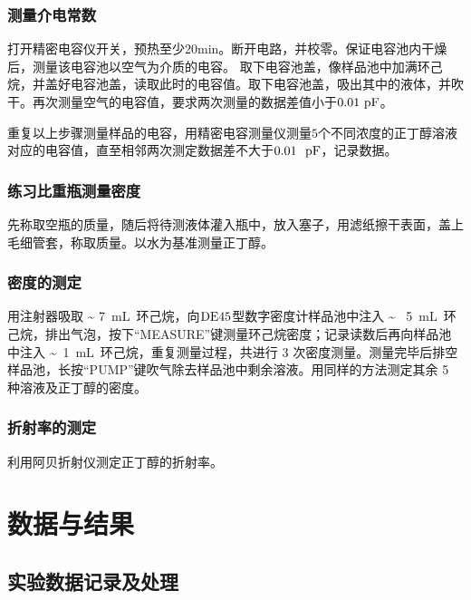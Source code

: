 \documentclass[12pt]{article}
\begin{document}
			\subsubsection{测量介电常数}
				打开精密电容仪开关，预热至少20min。断开电路，并校零。保证电容池内干燥后，测量该电容池以空气为介质的电容。
				取下电容池盖，像样品池中加满环己烷，并盖好电容池盖，读取此时的电容值。取下电容池盖，吸出其中的液体，并吹干。再次测量空气的电容值，要求两次测量的数据差值小于$0.01\ \rm{pF}$。 \par
				重复以上步骤测量样品的电容，用精密电容测量仪测量$5$个不同浓度的正丁醇溶液对应的电容值，直至相邻两次测定数据差不大于$0.01\ \ {\rm pF}$，记录数据。 \par
				
			\subsubsection{练习比重瓶测量密度}
				先称取空瓶的质量，随后将待测液体灌入瓶中，放入塞子，用滤纸擦干表面，盖上毛细管套，称取质量。以水为基准测量正丁醇。
				
			\subsubsection{密度的测定}
			用注射器吸取 \~{} 7\ mL\ 环己烷，向$\rm{DE45}$型数字密度计样品池中注入 \~{} \ 5\ mL\ 环己烷，排出气泡，按下“MEASURE”键测量环己烷密度；记录读数后再向样品池中注入 \~{}\ 1\ mL\ 环己烷，重复测量过程，共进行 3 次密度测量。测量完毕后排空样品池，长按“PUMP”键吹气除去样品池中剩余溶液。用同样的方法测定其余 5 种溶液及正丁醇的密度。
		\par	
			\subsubsection{折射率的测定}
				利用阿贝折射仪测定正丁醇的折射率。

				
    	
	\vbox{}
	 \section{数据与结果}
 		\subsection{实验数据记录及处理}
\end{document}

